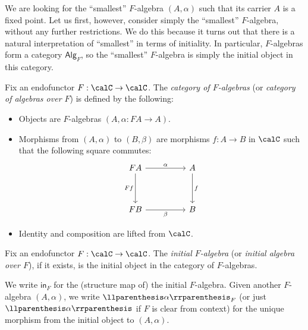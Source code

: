 We are looking for the ``smallest'' $F$-algebra $(A, \alpha)$ such that its carrier $A$ is a fixed
point. Let us first, however, consider simply the ``smallest'' $F$-algebra, without any further
restrictions. We do this because it turns out that there is a natural interpretation of ``smallest''
in terms of initiality. In particular, $F$-algebras form a category $\mathsf{Alg}_F$, so the
``smallest'' $F$-algebra is simply the initial object in this category.

\begin{definition}
  Fix an endofunctor $F : \calC \to \calC$. The \emph{category of $F$-algebras} (or \emph{category
  of algebras over $F$}) is defined by the following:
  \begin{itemize}
    \item Objects are $F$-algebras $(A, \alpha : F A \to A)$.
    \item Morphisms from $(A, \alpha)$ to $(B, \beta)$ are morphisms $f : A \to B$ in $\calC$ such
          that the following square commutes:
    \[\begin{tikzcd}
      {F A} && A \\
      \\
      {F B} && B
      \arrow["\alpha", from=1-1, to=1-3]
      \arrow["{F f}"', from=1-1, to=3-1]
      \arrow["f", from=1-3, to=3-3]
      \arrow["\beta"', from=3-1, to=3-3]
    \end{tikzcd}\]
    \item Identity and composition are lifted from $\calC$.
  \end{itemize}
\end{definition}

\begin{definition}
\sloppy
  Fix an endofunctor $F : \calC \to \calC$. The \emph{initial $F$-algebra} (or \emph{initial algebra
  over $F$}), if it exists, is the initial object in the category of $F$-algebras.

  We write $\mathsf{in}_F$ for the (structure map of) the initial $F$-algebra. Given another
  $F$-algebra $(A, \alpha)$, we write $\llpr{\alpha}_F$ (or just $\llpr{\alpha}$ if $F$ is clear
  from context) for the unique morphism from the initial object to $(A, \alpha)$.
\end{definition}

